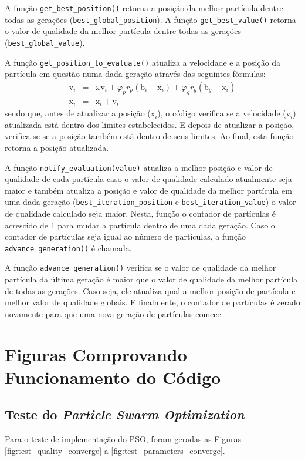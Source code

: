 \documentclass[brazil, 12pt]{article}
\begin{document}
A função \texttt{get\_best\_position()} retorna a posição da melhor partícula dentre todas as gerações (\texttt{best\_global\_position}). A função \texttt{get\_best\_value()} retorna o valor de qualidade da melhor partícula dentre todas as gerações (\texttt{best\_global\_value}).

A função \texttt{get\_position\_to\_evaluate()} atualiza a velocidade e a posição da partícula em questão numa dada geração através das seguintes fórmulas:
\begin{eqnarray}
	\text{v}_{i}&=&\omega\text{v}_{i}+\varphi_{p}r_{p}(\text{b}_{i}-\text{x}_{i})+\varphi_{g}r_{g}(\text{b}_{g}-\text{x}_{i})\\
	\text{x}_{i}&=&\text{x}_{i}+\text{v}_{i}
\end{eqnarray}sendo que, antes de atualizar a posição ($\text{x}_{i}$), o código verifica se a velocidade ($\text{v}_{i}$) atualizada está dentro dos limites estabelecidos. E depois de atualizar a posição, verifica-se se a posição também está dentro de seus limites. Ao final, esta função retorna a posição atualizada.

A função \texttt{notify\_evaluation(value)} atualiza a melhor posição e valor de qualidade de cada partícula caso o valor de qualidade calculado atualmente seja maior e também atualiza a posição e valor de qualidade da melhor partícula em uma dada geração (\texttt{best\_iteration\_position} e \texttt{best\_iteration\_value}) o valor de qualidade calculado seja maior. Nesta, função o contador de partículas é acrescido de 1 para mudar a partícula dentro de uma dada geração. Caso o contador de partículas seja igual ao número de partículas, a função \texttt{advance\_generation()} é chamada.

A função \texttt{advance\_generation()} verifica se o valor de qualidade da melhor partícula da última geração é maior que o valor de qualidade da melhor partícula de todas as gerações. Caso seja, ele atualiza qual a melhor posição de partícula e melhor valor de qualidade globais. E finalmente, o contador de partículas é zerado novamente para que uma nova geração de partículas comece.


\section{Figuras Comprovando Funcionamento do Código}
\subsection{Teste do \emph{Particle Swarm Optimization}}
Para o teste de implementação do PSO, foram geradas as Figuras \ref{fig:test_quality_converge} a \ref{fig:test_parameters_converge}.
\end{document}
